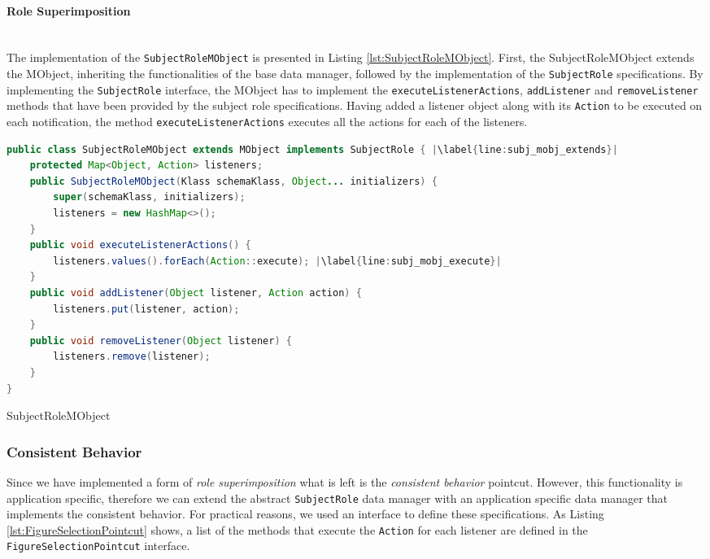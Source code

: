 \paragraph{Role Superimposition}\mbox{}\\
The implementation of the \texttt{SubjectRoleMObject} is presented in Listing \ref{lst:SubjectRoleMObject}.
First, the SubjectRoleMObject extends the MObject, inheriting the functionalities of the base data manager, followed by the implementation of the \texttt{SubjectRole} specifications.
By implementing the \texttt{SubjectRole} interface, the MObject has to implement the \texttt{executeListenerActions}, \texttt{addListener} and \texttt{removeListener} methods that have been provided by the subject role specifications.
Having added a listener object along with its \texttt{Action} to be executed on each notification, the method \texttt{executeListenerActions} executes all the actions for each of the listeners.

\begin{sourcecode} [H]
	\begin{lstlisting}[language=Java, escapechar=|]
public class SubjectRoleMObject extends MObject implements SubjectRole { |\label{line:subj_mobj_extends}|
	protected Map<Object, Action> listeners;
	public SubjectRoleMObject(Klass schemaKlass, Object... initializers) {
		super(schemaKlass, initializers);
		listeners = new HashMap<>();
	}
	public void executeListenerActions() {
		listeners.values().forEach(Action::execute); |\label{line:subj_mobj_execute}|
	}
	public void addListener(Object listener, Action action) {
		listeners.put(listener, action);
	}
	public void removeListener(Object listener) {
		listeners.remove(listener);
	}
}
	\end{lstlisting}
	\caption{SubjectRoleMObject}
	\label{lst:SubjectRoleMObject}
\end{sourcecode}

\subsubsection{Consistent Behavior}
Since we have implemented a form of \textit{role superimposition} what is left is the \textit{consistent behavior} pointcut.
However, this functionality is application specific, therefore we can extend the abstract \texttt{SubjectRole} data manager with an application specific data manager that implements the consistent behavior.
For practical reasons, we used an interface to define these specifications.
As Listing \ref{lst:FigureSelectionPointcut} shows, a list of the methods that execute the \texttt{Action} for each listener are defined in the \texttt{FigureSelectionPointcut} interface. 

